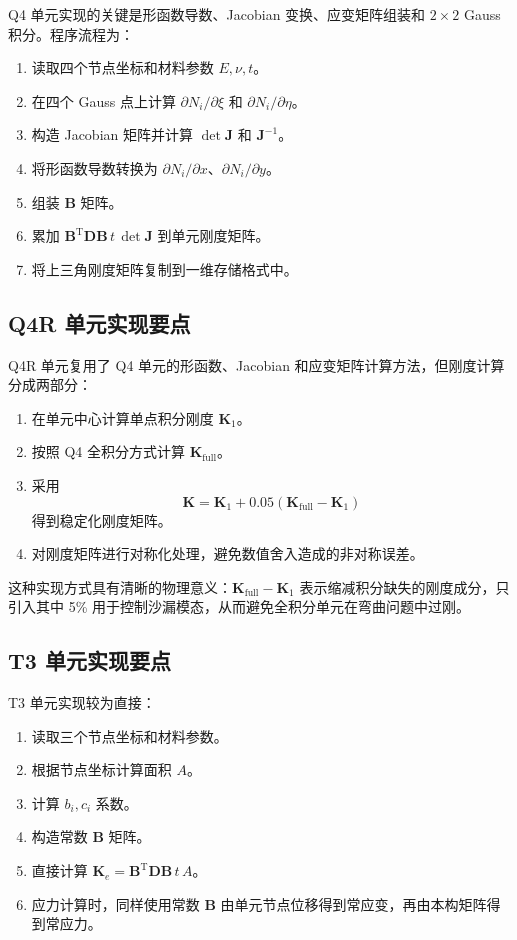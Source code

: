 \documentclass[UTF8,a4paper,zihao=-4]{ctexart}
\newcommand{\T}{\mathrm{T}}
\newcommand{\Dmat}{\bm{D}}
\newcommand{\Bmat}{\bm{B}}
\newcommand{\Kmat}{\bm{K}}
\begin{document}
Q4 单元实现的关键是形函数导数、Jacobian 变换、应变矩阵组装和 $2\times2$ Gauss 积分。程序流程为：

\begin{enumerate}
    \item 读取四个节点坐标和材料参数 $E,\nu,t$。
    \item 在四个 Gauss 点上计算 $\partial N_i/\partial \xi$ 和 $\partial N_i/\partial \eta$。
    \item 构造 Jacobian 矩阵并计算 $\det \bm{J}$ 和 $\bm{J}^{-1}$。
    \item 将形函数导数转换为 $\partial N_i/\partial x$、$\partial N_i/\partial y$。
    \item 组装 $\Bmat$ 矩阵。
    \item 累加 $\Bmat^{\T}\Dmat\Bmat\,t\,\det\bm{J}$ 到单元刚度矩阵。
    \item 将上三角刚度矩阵复制到一维存储格式中。
\end{enumerate}

\subsection{Q4R 单元实现要点}

Q4R 单元复用了 Q4 单元的形函数、Jacobian 和应变矩阵计算方法，但刚度计算分成两部分：

\begin{enumerate}
    \item 在单元中心计算单点积分刚度 $\Kmat_1$。
    \item 按照 Q4 全积分方式计算 $\Kmat_{\mathrm{full}}$。
    \item 采用
    \[
        \Kmat = \Kmat_1 + 0.05(\Kmat_{\mathrm{full}}-\Kmat_1)
    \]
    得到稳定化刚度矩阵。
    \item 对刚度矩阵进行对称化处理，避免数值舍入造成的非对称误差。
\end{enumerate}

这种实现方式具有清晰的物理意义：$\Kmat_{\mathrm{full}}-\Kmat_1$ 表示缩减积分缺失的刚度成分，只引入其中 5\% 用于控制沙漏模态，从而避免全积分单元在弯曲问题中过刚。

\subsection{T3 单元实现要点}

T3 单元实现较为直接：

\begin{enumerate}
    \item 读取三个节点坐标和材料参数。
    \item 根据节点坐标计算面积 $A$。
    \item 计算 $b_i,c_i$ 系数。
    \item 构造常数 $\Bmat$ 矩阵。
    \item 直接计算 $\Kmat_e=\Bmat^{\T}\Dmat\Bmat\,t\,A$。
    \item 应力计算时，同样使用常数 $\Bmat$ 由单元节点位移得到常应变，再由本构矩阵得到常应力。
\end{enumerate}
\end{document}
